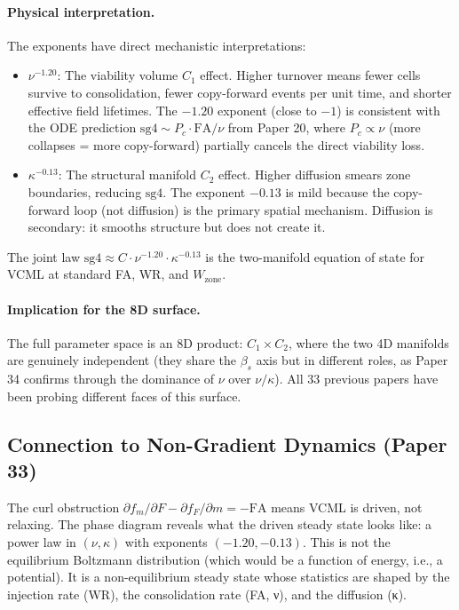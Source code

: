 \documentclass[11pt]{article}
\begin{document}
\paragraph{Physical interpretation.}
The exponents have direct mechanistic interpretations:
\begin{itemize}
\item $\nu^{-1.20}$: The viability volume $C_1$ effect. Higher turnover means fewer
  cells survive to consolidation, fewer copy-forward events per unit time, and shorter
  effective field lifetimes. The $-1.20$ exponent (close to $-1$) is consistent with
  the ODE prediction $\mathrm{sg4} \sim P_c \cdot \mathrm{FA} / \nu$ from Paper 20, where
  $P_c \propto \nu$ (more collapses = more copy-forward) partially cancels the direct
  viability loss.
\item $\kappa^{-0.13}$: The structural manifold $C_2$ effect. Higher diffusion smears
  zone boundaries, reducing $\mathrm{sg4}$. The exponent $-0.13$ is mild because the
  copy-forward loop (not diffusion) is the primary spatial mechanism. Diffusion is
  secondary: it smooths structure but does not create it.
\end{itemize}

The joint law $\mathrm{sg4} \approx C \cdot \nu^{-1.20} \cdot \kappa^{-0.13}$ is the
two-manifold equation of state for VCML at standard FA, WR, and $W_{\mathrm{zone}}$.

\paragraph{Implication for the 8D surface.}
The full parameter space is an 8D product: $C_1 \times C_2$, where the two 4D manifolds
are genuinely independent (they share the $\beta_s$ axis but in different roles, as
Paper 34 confirms through the dominance of $\nu$ over $\nu/\kappa$). All 33 previous
papers have been probing different faces of this surface.

\subsection{Connection to Non-Gradient Dynamics (Paper 33)}

The curl obstruction $\partial f_m/\partial F - \partial f_F/\partial m = -\mathrm{FA}$
means VCML is driven, not relaxing. The phase diagram reveals what the driven steady state
looks like: a power law in $(\nu, \kappa)$ with exponents $(-1.20, -0.13)$. This is not
the equilibrium Boltzmann distribution (which would be a function of energy, i.e., a
potential). It is a non-equilibrium steady state whose statistics are shaped by the
injection rate (WR), the consolidation rate (FA, ν), and the diffusion (κ).
\end{document}
